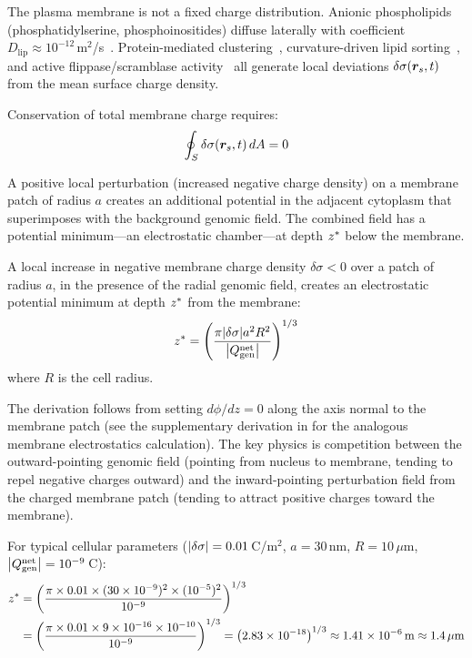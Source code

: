 The plasma membrane is not a fixed charge distribution. Anionic phospholipids (phosphatidylserine, phosphoinositides) diffuse laterally with coefficient $D_{\mathrm{lip}} \approx 10^{-12}$\,m$^2$/s~\cite{Saffman1975}. Protein-mediated clustering~\cite{McLaughlin2002}, curvature-driven lipid sorting~\cite{McMahon2005}, and active flippase/scramblase activity~\cite{Devaux1991} all generate local deviations $\delta\sigma(\boldsymbol{r}_s, t)$ from the mean surface charge density.

Conservation of total membrane charge requires:
\begin{equation}
  \oint_S \delta\sigma(\boldsymbol{r}_s, t)\,dA = 0
\end{equation}

A positive local perturbation (increased negative charge density) on a membrane patch of radius $a$ creates an additional potential in the adjacent cytoplasm that superimposes with the background genomic field. The combined field has a potential minimum---an electrostatic chamber---at depth $z^{*}$ below the membrane.

\begin{theorem}
\label{v:thm:chamber}
A local increase in negative membrane charge density $\delta\sigma < 0$ over a patch of radius $a$, in the presence of the radial genomic field, creates an electrostatic potential minimum at depth $z^{*}$ from the membrane:
\begin{equation}
  z^{*} = \left(\frac{\pi \abs{\delta\sigma} a^2 R^2}{\abs{Q_{\mathrm{gen}}^{\mathrm{net}}}}\right)^{1/3}
  \label{v:eq:z_star}
\end{equation}
where $R$ is the cell radius.
\end{theorem}

The derivation follows from setting $d\phi/dz = 0$ along the axis normal to the membrane patch (see the supplementary derivation in \citet{McLaughlin2002} for the analogous membrane electrostatics calculation). The key physics is competition between the outward-pointing genomic field (pointing from nucleus to membrane, tending to repel negative charges outward) and the inward-pointing perturbation field from the charged membrane patch (tending to attract positive charges toward the membrane).

For typical cellular parameters ($\abs{\delta\sigma} = 0.01$\,C/m$^2$, $a = 30$\,nm, $R = 10\,\mu$m, $\abs{Q_{\mathrm{gen}}^{\mathrm{net}}} = 10^{-9}$\,C):
\begin{align}
  z^{*} &= \left(\frac{\pi \times 0.01 \times (30 \times 10^{-9})^2 \times (10^{-5})^2}{10^{-9}}\right)^{1/3} \notag \\
         &= \left(\frac{\pi \times 0.01 \times 9 \times 10^{-16} \times 10^{-10}}{10^{-9}}\right)^{1/3}
          = \left(2.83 \times 10^{-18}\right)^{1/3} \approx 1.41 \times 10^{-6}\,\mathrm{m} \approx 1.4\,\mu\mathrm{m}
\end{align}

